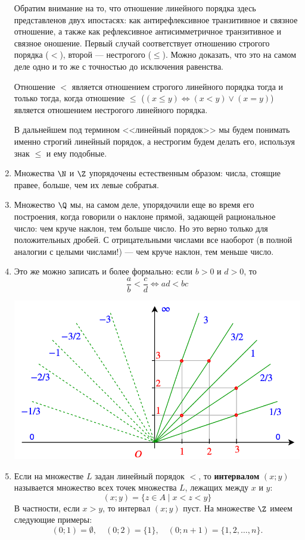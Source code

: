 \begin{enumerate}
{Обратим внимание на то, что отношение линейного порядка здесь представленов двух ипостасях: как антирефлексивное транзитивное и связное отношение, а также как рефлексивное антисимметричное транзитивное и связное оношение. Первый случай соответствует отношению строгого порядка ($<$), второй --- нестрогого ($\le$). Можно доказать, что это на самом деле одно и то же с точностью до исключения равенства.

\begin{lem} Отношение $<$ является отношением строгого линейного порядка тогда и только тогда, когда отношение $\le$ ($(x\le y)\Leftrightarrow (x<y)\lor (x=y)$) является отношением нестрогого линейного порядка.
\end{lem}

В дальнейшем под термином <<линейный порядок>> мы будем понимать именно строгий линейный порядок, а нестрогим будем делать его, используя знак $\le$ и ему подобные.}

\item Множества $\N$ и $\Z$ упорядочены естественным образом: числа, стоящие правее, больше, чем их левые собратья.
\item Множество $\Q$ мы, на самом деле, упорядочили еще во время его построения, когда говорили о наклоне прямой, задающей рациональное число: чем круче наклон, тем больше число. Но это верно только для положительных дробей. С отрицательными числами все наоборот (в полной аналогии с целыми числами!) --- чем круче наклон, тем меньше число.
\item Это же можно записать и более формально: если $b>0$ и $d>0$, то
$$
\frac{a}{b}<\frac{c}{d}\Leftrightarrow ad<bc
$$
\begin{center}
\includegraphics[scale=0.3]{ratio.png}
\end{center}
\item Если на множестве $L$ задан линейный порядок $<$, то \textbf{интервалом} $(x;y)$ называется множество всех точек множества $L$, лежащих между $x$ и $y$:
$$
(x;y) = \{z\in A\mid x<z<y\}
$$
В частности, если $x>y$, то интервал $(x;y)$ пуст. На множестве $\Z$ имеем следующие примеры:
$$
(0;1) = \emptyset,\quad (0;2) = \{1\}, \quad (0;n+1) = \{1,2,\dots, n\}.
$$



\end{enumerate}
